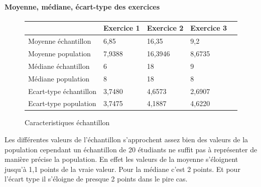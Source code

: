 \documentclass[a4paper, 11pt]{article}
\begin{document}
   \paragraph{Moyenne, médiane, écart-type des exercices}
   	\begin{figure}[H]
 	\begin{center}
   			\begin{tabular}{|l|l|l|l|l|}
				\hline
				  & Exercice 1 & Exercice 2 & Exercice 3 \\
				\hline
				Moyenne échantillon & 6,85  &  16,35  &   9,2  \\
  				Moyenne population & 7,9388  &  16,3946  &  8,6735  \\
  				\hline
  				Médiane échantillon & 6  & 18  & 9\\
  				Médiane population & 8  &  18  &  8  \\
  				\hline
  				Ecart-type échantillon & 3,7480  & 4,6573  & 2,6907\\
  				Ecart-type population & 3,7475  &  4,1887  &  4,6220  \\
				\hline
			\end{tabular}
			\caption{Caracteristiques échantillon} \label{Q2a1}
		\end{center}
		\end{figure}
		Les différentes valeurs de l'échantillon s'approchent assez bien des valeurs de la population cependant un échantillon de 20 étudiants ne suffit pas à représenter de manière précise la population. En effet les valeurs de la moyenne s'éloignent jusqu'à 1,1 points de la vraie valeur. Pour la médiane c'est 2 points. Et pour l'écart type il s'éloigne de presque 2 points dans le pire cas.
\end{document}
